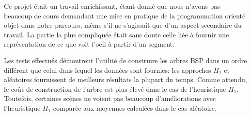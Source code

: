 Ce projet était un travail enrichissant, étant donné que nous n'avons
pas beaucoup de cours demandant une mise en pratique de la programmation
orienté objet dans notre parcours, même s'il ne s'agissait que d'un
aspect secondaire du travail. La partie la plus compliquée était
sans doute celle liée à fournir une représentation de ce que voit
l'oeil à partir d'un segment.

Les tests effectués démontrent l'utilité de construire les arbres BSP
dans un ordre différent que celui dans lequel les données sont fournies;
les approches $H_1$ et aléatoires fournissent de meilleurs résultats
la plupart du temps. Comme attendu, le coût de construction de l'arbre
est plus élevé dans le cas de l'heuristique $H_1$. Toutefois, certaines
scènes ne voient pas beaucoup d'améliorations avec l'heuristique $H_1$
comparée aux moyennes calculées dans le cas aléatoire.


